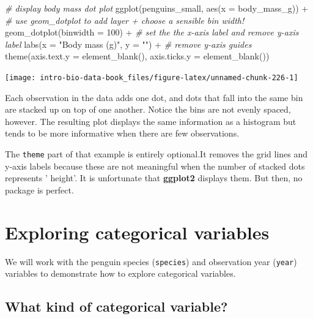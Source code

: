 \documentclass[
]{book}
\newenvironment{Shaded}{\begin{snugshade}}{\end{snugshade}}
\newcommand{\AttributeTok}[1]{\textcolor[rgb]{0.77,0.63,0.00}{#1}}
\newcommand{\CommentTok}[1]{\textcolor[rgb]{0.56,0.35,0.01}{\textit{#1}}}
\newcommand{\DecValTok}[1]{\textcolor[rgb]{0.00,0.00,0.81}{#1}}
\newcommand{\FunctionTok}[1]{\textcolor[rgb]{0.00,0.00,0.00}{#1}}
\newcommand{\NormalTok}[1]{#1}
\newcommand{\SpecialCharTok}[1]{\textcolor[rgb]{0.00,0.00,0.00}{#1}}
\newcommand{\StringTok}[1]{\textcolor[rgb]{0.31,0.60,0.02}{#1}}
\begin{document}
\begin{Shaded}
\begin{Highlighting}[]
\CommentTok{\# display body mass dot plot}
\FunctionTok{ggplot}\NormalTok{(penguins\_small, }\FunctionTok{aes}\NormalTok{(}\AttributeTok{x =}\NormalTok{ body\_mass\_g)) }\SpecialCharTok{+} 
  \CommentTok{\# use geom\_dotplot to add layer + choose a sensible bin width!}
  \FunctionTok{geom\_dotplot}\NormalTok{(}\AttributeTok{binwidth =} \DecValTok{100}\NormalTok{) }\SpecialCharTok{+}
  \CommentTok{\# set the the x{-}axis label and remove y{-}axis label}
  \FunctionTok{labs}\NormalTok{(}\AttributeTok{x =} \StringTok{"Body mass (g)"}\NormalTok{, }\AttributeTok{y =} \StringTok{""}\NormalTok{) }\SpecialCharTok{+}
  \CommentTok{\# remove y{-}axis guides}
  \FunctionTok{theme}\NormalTok{(}\AttributeTok{axis.text.y =} \FunctionTok{element\_blank}\NormalTok{(), }\AttributeTok{axis.ticks.y =} \FunctionTok{element\_blank}\NormalTok{())}
\end{Highlighting}
\end{Shaded}

\begin{center}\texttt{[image: intro-bio-data-book\_files/figure-latex/unnamed-chunk-226-1]} \end{center}

Each observation in the data adds one dot, and dots that fall into the same bin are stacked up on top of one another. Notice the bins are not evenly spaced, however. The resulting plot displays the same information as a histogram but tends to be more informative when there are few observations.

The \texttt{theme} part of that example is entirely optional.It removes the grid lines and y-axis labels because these are not meaningful when the number of stacked dots represents ' height'. It is unfortunate that \textbf{ggplot2} displays them. But then, no package is perfect.

\hypertarget{explore-categorical}{%
\section{Exploring categorical variables}\label{explore-categorical}}

We will work with the penguin species (\texttt{species}) and observation year (\texttt{year}) variables to demonstrate how to explore categorical variables.

\hypertarget{what-kind-of-categorical-variable}{%
\subsection{What kind of categorical variable?}\label{what-kind-of-categorical-variable}}
\end{document}
